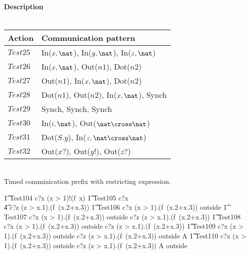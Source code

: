 \documentclass{article}
\begin{document}
\paragraph{Description \\ \\}

\vspace{2pt}
\begin{tabular}{l|l}
   \hline
   Action   & Communication pattern \\
   \hline
   $Test25$  & In($x, \nat$), In($y, \nat$), In($z, \nat$) \\
   \hline
   $Test26$  & In($x, \nat$), Out($n1$), Dot($n2$) \\
   \hline
   $Test27$  & Out($n1$), In($x, \nat$), Dot($n2$) \\
   \hline
   $Test28$  & Dot($n1$), Out($n2$), In($x, \nat$), Synch \\
   \hline
   $Test29$  & Synch, Synch, Synch \\
   \hline
   $Test30$  & In($i, \nat$), Out($\nat \cross \nat$) \\
   \hline
   $Test31$  & Dot($S.y$), In($z, \nat \cross \nat$) \\
   \hline
   $Test32$  & Out($x?$), Out($y!$), Out($z?$) \\
   \hline
\end{tabular}
\\

Timed comminication prefix  with restricting expression. 
%
\begin{circusaction}
   \t1 Test104 \circdef c?x \prefixcolon (x > 1)!(f~x) \then  \Skip
   \also
   \t1 Test105 \circdef c?x \then \\
                  \t4 c?z \prefixcolon (z > x.1).(f~(x.2+x.3)) \then \Skip 
   \also
   \t1 Test106 \circdef c?x \prefixcolon (x > 1).(f~(x.2+x.3)) \then \lcirctime outside \rcirctime 
   \Skip 
   \also
   \t1 Test107 \circdef c?x \prefixcolon (x > 1).(f~(x.2+x.3)) \then \lcirctime outside \rcirctime 
    c?z \prefixcolon (z > x.1).(f~(x.2+x.3)) \then \Skip 
   \also
   \t1 Test108 \circdef c?x \prefixcolon (x > 1).(f~(x.2+x.3)) \then \lcirctime outside \rcirctime 
    c?z \prefixcolon (z > x.1).(f~(x.2+x.3)) \then {} \rcirctime \Skip 
   \also
   \t1 Test109 \circdef c?x \prefixcolon (x > 1).(f~(x.2+x.3)) \then \lcirctime outside \rcirctime 
    c?z \prefixcolon (z > x.1).(f~(x.2+x.3)) \then {} \rcirctime \lcirctime outside 
   \rcirctime \circstartby A 
   \also
   \t1 Test110 \circdef c?x \prefixcolon (x > 1).(f~(x.2+x.3)) \then \lcirctime outside \rcirctime 
    c?z \prefixcolon (z > x.1).(f~(x.2+x.3)) \then {} \rcirctime A \circendby  
   \lcirctime outside \rcirctime 
\end{circusaction}
\end{document}
